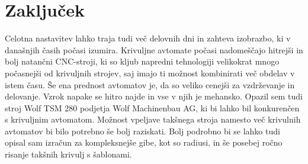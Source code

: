 \newpage
\section{Zaključek}
Celotna nastavitev lahko traja tudi več delovnih dni in zahteva
izobrazbo, ki v današnjih časih počasi izumira. Krivuljne avtomate
počasi nadomeščajo hitrejši in bolj natančni CNC-stroji, ki so kljub
napredni tehnologiji velikokrat mnogo počasnejši od krivuljnih strojev, saj
imajo ti možnost kombinirati več obdelav v istem času. Še ena prednost avtomatov je, da so veliko cenejši
za vzdrževanje in delovanje. Vzrok napake se hitro najde in vse v njih je
mehansko. Opazil sem tudi stroj Wolf TSM 280 podjetja Wolf Machinenbau AG,
ki bi lahko bil konkurenčen s krivuljnim avtomatom. Možnost vpeljave
takšnega stroja namesto več krivulnih avtomatov bi bilo potrebno
še bolj raziskati. Bolj podrobno bi se lahko tudi opisal
sam izračun za kompleksnejše gibe, kot so radiusi, in še posebej
ročno risanje takšnih krivulj s šablonami.